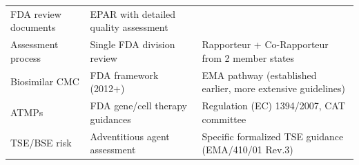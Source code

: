 \documentclass[
  11pt,
  a4paper,
]{report}
\begin{document}
\begin{longtable}[]{@{}lll@{}}
\begin{minipage}[t]{0.33\columnwidth}
FDA review documents\strut
\end{minipage} & \begin{minipage}[t]{0.33\columnwidth}\raggedright
EPAR with detailed quality assessment\strut
\end{minipage}\tabularnewline
\begin{minipage}[t]{0.26\columnwidth}\raggedright
Assessment process\strut
\end{minipage} & \begin{minipage}[t]{0.33\columnwidth}\raggedright
Single FDA division review\strut
\end{minipage} & \begin{minipage}[t]{0.33\columnwidth}\raggedright
Rapporteur + Co-Rapporteur from 2 member states\strut
\end{minipage}\tabularnewline
\begin{minipage}[t]{0.26\columnwidth}\raggedright
Biosimilar CMC\strut
\end{minipage} & \begin{minipage}[t]{0.33\columnwidth}\raggedright
FDA framework (2012+)\strut
\end{minipage} & \begin{minipage}[t]{0.33\columnwidth}\raggedright
EMA pathway (established earlier, more extensive guidelines)\strut
\end{minipage}\tabularnewline
\begin{minipage}[t]{0.26\columnwidth}\raggedright
ATMPs\strut
\end{minipage} & \begin{minipage}[t]{0.33\columnwidth}\raggedright
FDA gene/cell therapy guidances\strut
\end{minipage} & \begin{minipage}[t]{0.33\columnwidth}\raggedright
Regulation (EC) 1394/2007, CAT committee\strut
\end{minipage}\tabularnewline
\begin{minipage}[t]{0.26\columnwidth}\raggedright
TSE/BSE risk\strut
\end{minipage} & \begin{minipage}[t]{0.33\columnwidth}\raggedright
Adventitious agent assessment\strut
\end{minipage} & \begin{minipage}[t]{0.33\columnwidth}\raggedright
Specific formalized TSE guidance (EMA/410/01 Rev.3)\strut
\end{minipage}\tabularnewline
\bottomrule
\end{longtable}
\end{document}
